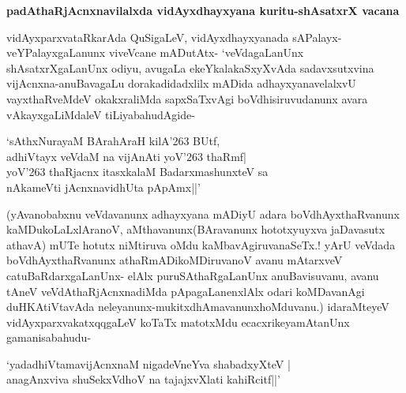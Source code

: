 {\smallskip
\noindent
{\large\bf padAthaRjAcnxnavilalxda vidAyxdhayxyana kuritu-shAsatxrX vacana}}\label{page39}
\smallskip

\noindent
vidAyxparxvataRkarAda QuSigaLeV, vidAyxdhayxyanada sAPalayx-veYPalayxgaLanunx viveVcane mADutAtx- `veVda\-gaLanUnx shAsatxrXgaLanUnx odiyu, avugaLa ekeYkalakaSxyXvAda sadavxsutxvina vijAcnxna-anuBavagaLu doraka\-didadxlilx mADida adhayxyanavelalxvU vayxthaRveMdeV okakxraliMda sapxSaTxvAgi boVdhisiruvudanunx
avara vAkayx\-gaLiM\-daleV tiLiyabahudAgide-

\begin{shloka}
`sAthxNurayaM BArahAraH kilA\char'263 BUtf,\\\label{39}
adhiVtayx veVdaM na vijAnAti yoV\char'263 thaRmf|\\
yoV\char'263 thaRjacnx itasxkalaM BadarxmashunxteV sa\\
nAkameVti jAcnxnavidhUta pApAmx||'
\end{shloka}

\noindent
(yAvanobabxnu veVdavanunx adhayxyana mADiyU adara boVdhAyxthaRvanunx kaMDu\-koLaLx\-lAranoV, aMthavanunx(BAravanunx hototxyuyxva jaDavasutx athavA) mUTe hotutx niMtiruva oMdu kaMba\-vAgi\-ruva\-naSeTx.! yArU veVdada boVdhAyxthaR\-vanunx athaRmADikoMDiruvanoV avanu mAtarxveV catuBaRdarx\-gaLanUnx- elAlx puru\-SAthaRgaLanUnx anuBavisuvanu, avanu tAneV veVdAthaR\-jAcnxna\-diMda pApa\-gaLa\break\-nenxlAlx odari koMDavanAgi duHKAtiVtavAda neleyanunx-mukitxdhAmavanunx\break hoMdu\-vanu.) ida\-raM\-teyeV vidAyxparxvakatxqqgaLeV koTaTx matotxMdu ecacxrikeya\break mAtanUnx gamanisabahudu-

\begin{shloka}
`yadadhiVtamavijAcnxnaM nigadeVneYva shabadxyXteV |\\\label{39}
anagAnxviva shuSekxVdhoV na tajajxvXlati kahiRcitf||'
\end{shloka}

